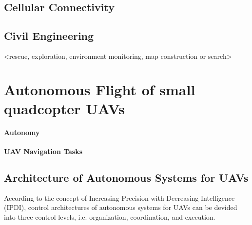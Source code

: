 

\subsection{Cellular Connectivity}



\subsection{Civil Engineering}



<rescue,   exploration,  environment  monitoring,  map  construction  or  search>




\section{Autonomous Flight of small quadcopter UAVs}


\paragraph{Autonomy}


\paragraph{UAV Navigation Tasks}



\subsection{Architecture of Autonomous Systems for UAVs}

According to the concept of 
Increasing Precision with Decreasing Intelligence (IPDI),
control architectures of autonomous systems for UAVs 
can be devided into three control levels, i.e.
organization, coordination, and execution.

